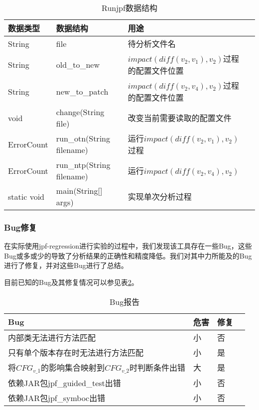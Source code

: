 \begin{table}
	\caption{Runjpf数据结构}
	\label{run_jpf_data}
	\centering
	\begin{tabular}{lllc}
		\toprule[1.5pt]
		{\heiti 数据类型} &{\heiti 数据结构} & {\heiti 用途} \\\midrule[1pt]
		String & file & 待分析文件名\\
		String & old\_to\_new & $impact(diff(v_2,v_1),v_2)$过程的配置文件位置\\
		String & new\_to\_patch & $impact(diff(v_2,v_4),v_2)$过程的配置文件位置\\
		void & change(String file) & 改变当前需要读取的配置文件\\
		ErrorCount & run\_otn(String filename) & 运行$impact(diff(v_2,v_1),v_2)$过程 \\
		ErrorCount & run\_ntp(String filename) & 运行$impact(diff(v_2,v_4),v_2)$  \\
		static void & main(String[] args) & 实现单次分析过程\\
		\bottomrule[1.5pt]
	\end{tabular}
\end{table}


\subsubsection{Bug修复}

在实际使用jpf-regression进行实验的过程中，我们发现该工具存在一些Bug，这些Bug或多或少的导致了分析结果的正确性和精度降低。我们对其中力所能及的Bug进行了修复，并对这些Bug进行了总结。

目前已知的Bug及其修复情况可以参见表\ref {bug_data}。

\begin{table}
	\caption{Bug报告}
	\label{bug_data}
	\centering
	\begin{tabular}{lllc}
		\toprule[1.5pt]
		{\heiti Bug} &{\heiti 危害} & {\heiti 修复} \\\midrule[1pt]
		内部类无法进行方法匹配 & 小 & 否\\
		只有单个版本存在时无法进行方法匹配 & 小 & 是\\
		将$CFG_{v\_1}$的影响集合映射到$CFG_{v\_2}$时判断条件出错 & 大 & 是\\
		依赖JAR包jpf\_guided\_test出错 & 小 & 否\\
		依赖JAR包jpf\_symboc出错 & 小 & 否\\
		\bottomrule[1.5pt]
	\end{tabular}
\end{table}

